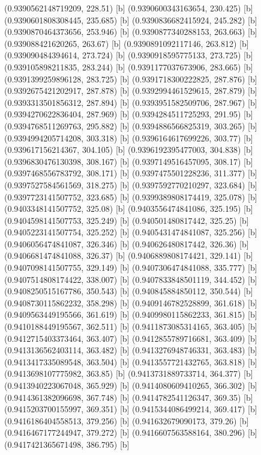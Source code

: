 {{{(0.9390562148719209, 228.51) [b] 
(0.9390600343163654, 230.425) [b] 
(0.9390601808308445, 235.685) [b] 
(0.9390836682415924, 245.282) [b] 
(0.9390870464373656, 253.946) [b] 
(0.9390877340288153, 263.663) [b] 
(0.939088421620265, 263.67) [b] 
(0.9390891092117146, 263.812) [b] 
(0.939090484394614, 273.724) [b] 
(0.9390918595775133, 273.725) [b] 
(0.939105898211835, 283.244) [b] 
(0.9391177037673906, 283.665) [b] 
(0.9391399259896128, 283.725) [b] 
(0.9391718300222825, 287.876) [b] 
(0.9392675421202917, 287.878) [b] 
(0.9392994461529615, 287.879) [b] 
(0.9393313501856312, 287.894) [b] 
(0.9393951582509706, 287.967) [b] 
(0.9394270622836404, 287.969) [b] 
(0.9394284511725293, 291.95) [b] 
(0.9394768511269763, 295.882) [b] 
(0.9394886566825319, 303.265) [b] 
(0.9394994205714208, 303.318) [b] 
(0.9396164617699226, 303.77) [b] 
(0.939617156214367, 304.105) [b] 
(0.9396192395477003, 304.838) [b] 
(0.9396830476130398, 308.167) [b] 
(0.9397149516457095, 308.17) [b] 
(0.9397468556783792, 308.171) [b] 
(0.9397475501228236, 311.377) [b] 
(0.9397527584561569, 318.275) [b] 
(0.9397592770210297, 323.684) [b] 
(0.9397723141507752, 323.685) [b] 
(0.9399389808174419, 325.078) [b] 
(0.9403348141507752, 325.08) [b] 
(0.9403556474841086, 325.195) [b] 
(0.9404598141507753, 325.249) [b] 
(0.940501480817442, 325.25) [b] 
(0.9405223141507754, 325.252) [b] 
(0.9405431474841087, 325.256) [b] 
(0.9406056474841087, 326.346) [b] 
(0.940626480817442, 326.36) [b] 
(0.9406681474841088, 326.37) [b] 
(0.9406889808174421, 329.141) [b] 
(0.9407098141507755, 329.149) [b] 
(0.9407306474841088, 335.777) [b] 
(0.9407514808174422, 338.007) [b] 
(0.9407833848501119, 344.452) [b] 
(0.9408250515167786, 350.543) [b] 
(0.940845884850112, 350.544) [b] 
(0.9408730115862232, 358.298) [b] 
(0.9409146782528899, 361.618) [b] 
(0.9409563449195566, 361.619) [b] 
(0.9409980115862233, 361.815) [b] 
(0.9410188449195567, 362.511) [b] 
(0.9411873085314165, 363.405) [b] 
(0.9412715403373464, 363.407) [b] 
(0.9412855789716681, 363.409) [b] 
(0.9413136562403114, 363.482) [b] 
(0.9413276948746331, 363.483) [b] 
(0.9413417335089548, 363.504) [b] 
(0.9413557721432765, 363.818) [b] 
(0.9413698107775982, 363.85) [b] 
(0.9413731889733714, 364.377) [b] 
(0.9413940223067048, 365.929) [b] 
(0.9414080609410265, 366.302) [b] 
(0.9414361382096698, 367.748) [b] 
(0.9414782541126347, 369.35) [b] 
(0.9415203700155997, 369.351) [b] 
(0.9415344086499214, 369.417) [b] 
(0.9416186404558513, 379.256) [b] 
(0.941632679090173, 379.26) [b] 
(0.9416467177244947, 379.272) [b] 
(0.9416607563588164, 380.296) [b] 
(0.9417421365671498, 386.795) [b] 
}}}
